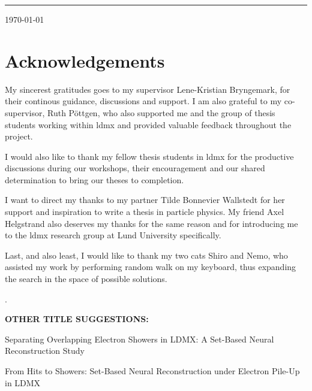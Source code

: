 \begin{titlepage}
\begin{center}
  \vspace{0.18in}
  \noindent\rule{\textwidth}{1pt}
\end{center}

\vspace{0.35in}

\begin{abstract}

\end{abstract}

\vfill

\begin{center}
  \today
\end{center}
\end{titlepage}

\clearpage
\thispagestyle{empty}
\section*{Acknowledgements}

My sincerest gratitudes goes to my supervisor Lene-Kristian Bryngemark, for their continous guidance, discussions and support. I am also grateful to my co-supervisor, Ruth Pöttgen, who also supported me and the group of thesis students working within \gls{ldmx} and provided valuable feedback throughout the project.

I would also like to thank my fellow thesis students in \gls{ldmx} for the productive discussions during our workshops, their encouragement and our shared determination to bring our theses to completion.

I want to direct my thanks to my partner Tilde Bonnevier Wallstedt for her support and inspiration to write a thesis in particle physics. My friend Axel Helgstrand also deserves my thanks for the same reason and for introducing me to the \gls{ldmx} research group at Lund University specifically. 

Last, and also least, I would like to thank my two cats Shiro and Nemo, who assisted my work by performing random walk on my keyboard, thus expanding the search in the space of possible solutions.

.


\textbf{OTHER TITLE SUGGESTIONS:}

Separating Overlapping Electron Showers in LDMX: A Set-Based Neural Reconstruction Study

From Hits to Showers: Set-Based Neural Reconstruction under Electron Pile-Up in LDMX


